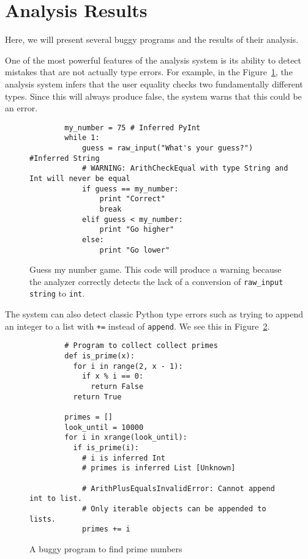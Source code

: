 \documentclass{article}[12pt]
\begin{document}
\section{Analysis Results}

Here, we will present several buggy programs and the results of their analysis.

One of the most powerful features of the analysis system is its ability to detect mistakes that are
not actually type errors. For example, in the Figure~\ref{fig:guessnum}, the analysis system infers that the
user equality checks two fundamentally different types. Since this will always produce false, the
system warns that this could be an error.

\begin{figure}
    \begin{verbatim}
        my_number = 75 # Inferred PyInt
        while 1:
            guess = raw_input("What's your guess?") #Inferred String
            # WARNING: ArithCheckEqual with type String and Int will never be equal 
            if guess == my_number:
                print "Correct"
                break
            elif guess < my_number:
                print "Go higher"
            else:
                print "Go lower"
    \end{verbatim}
    \caption{Guess my number game. This code will produce a warning because the analyzer correctly
        detects the lack of a conversion of \texttt{raw\_input} \texttt{string} to \texttt{int}.}
    \label{fig:guessnum}
\end{figure}

The system can also detect classic Python type errors such as trying to append an integer to a list
with \texttt{+=} instead of \texttt{append}. We see this in Figure~\ref{fig:findprimes}.
\begin{figure}
    \begin{verbatim}
        # Program to collect collect primes
        def is_prime(x):
          for i in range(2, x - 1):
            if x % i == 0:
              return False
          return True
        
        primes = []
        look_until = 10000
        for i in xrange(look_until):
          if is_prime(i):
            # i is inferred Int
            # primes is inferred List [Unknown]

            # ArithPlusEqualsInvalidError: Cannot append int to list. 
            # Only iterable objects can be appended to lists.
            primes += i
    \end{verbatim}
    \caption{A buggy program to find prime numbers}
    \label{fig:findprimes}
\end{figure}
\end{document}
